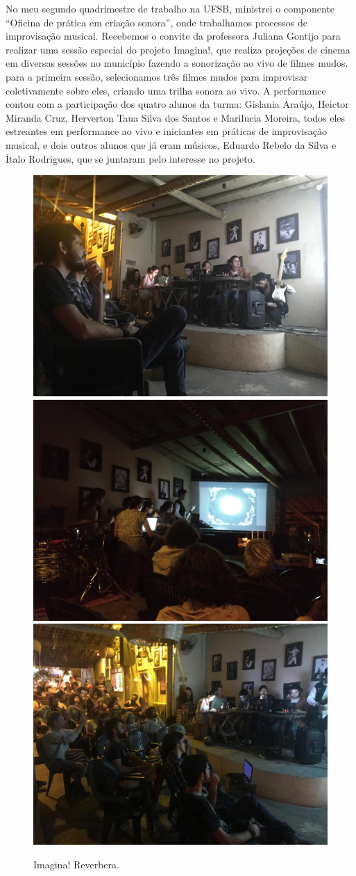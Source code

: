 No meu segundo quadrimestre de trabalho na UFSB, ministrei o componente ``Oficina de prática em criação sonora'', onde trabalhamos processos de improvisação musical. Recebemos o convite da professora Juliana Gontijo para realizar uma sessão especial do projeto Imagina!, que realiza projeções de cinema em diversas sessões no município fazendo a sonorização ao vivo de filmes mudos. para a primeira sessão, selecionamos três filmes mudos para improvisar coletivamente sobre eles, criando uma trilha sonora ao vivo. A performance contou com a participação dos quatro alunos da turma: Gislania Araújo, Heictor Miranda Cruz, Herverton Taua Silva dos Santos e Marilucia Moreira, todos eles estreantes em performance ao vivo e iniciantes em práticas de improvisação musical, e dois outros alunos que já eram músicos, Eduardo Rebelo da Silva e Ítalo Rodrigues, que se juntaram pelo interesse no projeto.
\begin{figure}

\includegraphics[width=0.7\linewidth]{pictures/cap4/imagina1a}
\includegraphics[width=0.7\linewidth]{pictures/cap4/imagina1b}
\includegraphics[width=0.7\linewidth]{pictures/cap4/imagina1c}
\caption{Imagina! Reverbera.}
\label{Fotos: Juliana Gontijo}
\label{reverbera}
\end{figure}


